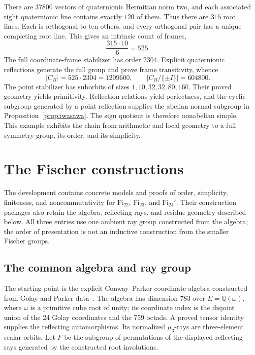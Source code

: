 \documentclass[11pt]{article}
\numberwithin{equation}{section}
\theoremstyle{definition}
\newcommand{\Fi}{\mathrm{Fi}}
\begin{document}
There are $37800$ vectors of quaternionic Hermitian norm two, and
each associated right quaternionic line contains exactly $120$ of them.
Thus there are $315$ root lines. Each is orthogonal to ten others,
and every orthogonal pair has a unique completing root line. This
gives an intrinsic count of frames,
\[
 \frac{315\cdot10}{6}=525.
\]
The full coordinate-frame stabilizer has order $2304$. Explicit
quaternionic reflections generate the full group and prove frame
transitivity, whence
\begin{equation}\label{eq:j2order}
 |C_H|=525\cdot2304=1209600,\qquad
 |C_H/\{\pm I\}|=604800.
\end{equation}
The point stabilizer has suborbits of sizes
$1,10,32,32,80,160$. Their proved geometry yields primitivity.
Reflection relations yield perfectness, and the cyclic subgroup
generated by a point reflection supplies the abelian normal subgroup
in Proposition~\ref{prop:iwasawa}. The sign quotient is therefore
nonabelian simple. This example exhibits the chain from arithmetic and
local geometry to a full symmetry group, its order, and its simplicity.

\section{The Fischer constructions}\label{sec:fischer}

The development contains concrete models and proofs of order, simplicity,
finiteness, and noncommutativity for $\Fi_{22}$, $\Fi_{23}$,
and $\Fi_{24}'$. Their construction packages also retain the algebra,
reflecting rays, and residue geometry described below. All three
entries use one ambient ray group constructed from the algebra;
the order of presentation is not an inductive construction from the
smaller Fischer groups.

\subsection{The common algebra and ray group}

The starting point is the explicit Conway--Parker coordinate
algebra constructed from Golay and Parker data~\cite{FischerAlgebra}. The algebra has dimension $783$ over
$E=\mathbb Q(\omega)$, where $\omega$ is a primitive cube root of unity;
its coordinate index is the disjoint union of the 24 Golay coordinates
and the 759 octads. A proved tensor identity supplies the reflecting
automorphisms. Its normalized $\mu_3$-rays are three-element scalar orbits.
Let $F$ be the subgroup of permutations of the displayed reflecting
rays generated by the constructed root involutions.
\end{document}
